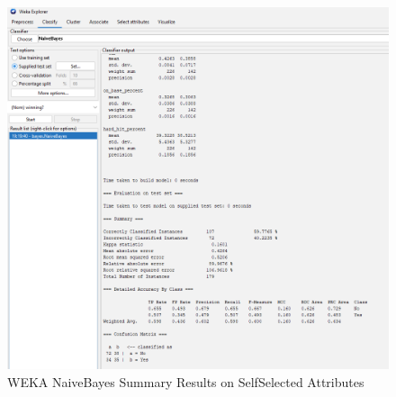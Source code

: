 \documentclass[12pt]{article}
\begin{document}
\begin{figure}[h!]
    \includegraphics[scale=0.4]{./images/SelfSelected/NaiveBayes-Summary.png}
\centering
    \caption{WEKA NaiveBayes Summary Results on SelfSelected Attributes}
\end{figure}

\newpage
\end{document}
